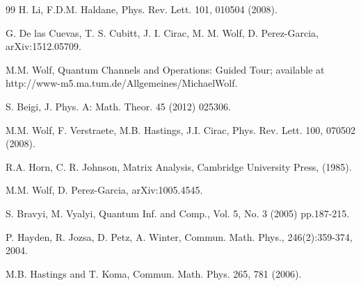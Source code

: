 \documentclass{elsarticle}
\begin{document}
\begin{thebibliography}{99}
    H. Li, F.D.M. Haldane,
    Phys. Rev. Lett. 101,  010504 (2008).

    G. De las Cuevas, T. S. Cubitt, J. I. Cirac, M. M. Wolf, D. Perez-Garcia,
    arXiv:1512.05709.

    M.M. Wolf,
    Quantum Channels and Operations: Guided Tour; available at http://www-m5.ma.tum.de/Allgemeines/MichaelWolf.

    S. Beigi,
    J. Phys. A: Math. Theor. 45 (2012) 025306.

    M.M. Wolf, F. Verstraete, M.B. Hastings, J.I. Cirac,
    Phys. Rev. Lett. 100, 070502 (2008).

    R.A. Horn, C. R. Johnson,
    Matrix Analysis, Cambridge University Press,  (1985).

    M.M. Wolf, D. Perez-Garcia,
    arXiv:1005.4545.


    S. Bravyi, M. Vyalyi,
    Quantum Inf. and Comp., Vol. 5, No. 3 (2005) pp.187-215.

    P. Hayden, R. Jozsa, D. Petz,  A. Winter,
    Commun. Math. Phys., 246(2):359-374, 2004.

    M.B. Hastings and T. Koma,
    Commun. Math. Phys. {265}, 781  (2006).

\end{thebibliography}
\end{document}
